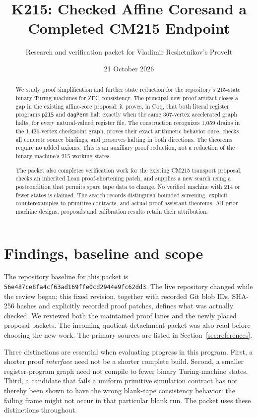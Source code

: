 \documentclass[11pt,letterpaper]{article}
\title{K215: Checked Affine Cores\newline and a Completed CM215 Endpoint}
\author{Research and verification packet for Vladimir Reshetnikov's ProveIt}
\date{21 October 2026}
\theoremstyle{definition}\newtheorem{definition}[theorem]{Definition}
\newcommand{\pin}{\texttt{56e487ce8fa4cf63ad169ffe0cd2944e9fc62dd3}}
\begin{document}
\maketitle
\begin{abstract}
We study proof simplification and further state reduction for the repository's
215-state binary Turing machines for ZFC consistency. The principal new proof
artifact closes a gap in the existing affine-core proposal: it proves, in Coq,
that both literal register programs \texttt{p215} and \texttt{dagPerm} halt
exactly when the same 367-vertex accelerated graph halts, for every natural-valued
register file. The construction recognizes 1,059 drains in the 1,426-vertex
checkpoint graph, proves their exact arithmetic behavior once, checks all
concrete source bindings, and preserves halting in both directions. The
theorems require no added axioms. This is an auxiliary proof reduction, not a
reduction of the binary machine's 215 working states.

The packet also completes verification work for the existing CM215 transport
proposal, checks an inherited Lean proof-shortening patch, and supplies a
new search using a postcondition that permits spare tape data to change.
No verified machine with 214 or fewer states is claimed. The search records
distinguish bounded screening, explicit counterexamples to primitive contracts,
and actual proof-assistant theorems. All prior machine designs, proposals and
calibration results retain their attribution.
\end{abstract}

\setcounter{tocdepth}{1}
\tableofcontents
\newpage

\section{Findings, baseline and scope}

The repository baseline for this packet is \pin. The live repository changed
while the review began; this fixed revision, together with recorded Git blob
IDs, SHA-256 hashes and explicitly recorded proof patches, defines what was
actually checked. We reviewed both
the maintained proof lanes and the newly placed proposal packets. The incoming
quotient-detachment packet was also read before choosing the new work.
The primary sources are listed in Section~\ref{sec:references}.

Three distinctions are essential when evaluating progress in this program.
First, a shorter proof \emph{interface} need not be a shorter complete build.
Second, a smaller register-program graph need not compile to fewer binary
Turing-machine states. Third, a candidate that fails a uniform primitive
simulation contract has not thereby been shown to have the wrong blank-tape
consistency behavior: the failing frame might not occur in that particular
blank run. The packet uses these distinctions throughout.
\end{document}
